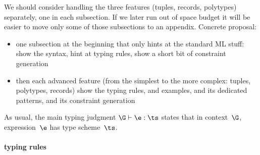 \documentclass[acmsmall,screen,nonacm,review]{acmart}
\begin{document}
\begin{version}{}
\TODO

  {We should consider handling the three features (tuples, records,
  polytypes) separately, one in each subsection. If we later run out of
  space budget it will be easier to move only some of those subsections to
  an appendix.  Concrete proposal:
\begin{itemize}
\item
  one subsection at the beginning that only hints at the standard ML stuff:
  show the syntax, hint at typing rules, show a short bit of constraint
  generation
\item
  then each advanced feature (from the simplest to the more complex: tuples,
  polytypes, records) show the typing rules, and examples, and its dedicated
  patterns, and its constraint generation
\end{itemize}}
\end{version}

As usual, the main typing judgment $\G \th \e : \ts$ states that in
context~$\G$, expression~$\e$ has type scheme~$\ts$.

\paragraph {\ML typing rules}

\end{document}
